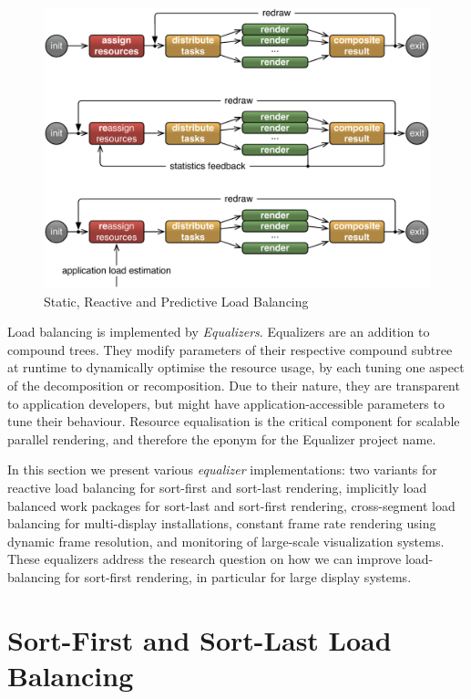 \begin{figure}[h!t]
  \includegraphics[width=\textwidth]{images/loadBalancing}
  \caption{\label{floadbalancing}Static, Reactive and Predictive Load Balancing}
\end{figure}

Load balancing is implemented by {\em Equalizers}. Equalizers are an addition
to compound trees. They modify parameters of their respective compound subtree
at runtime to dynamically optimise the resource usage, by each tuning one
aspect of the decomposition or recomposition. Due to their nature, they are
transparent to application developers, but might have application-accessible
parameters to tune their behaviour. Resource equalisation is the critical
component for scalable parallel rendering, and therefore the eponym for the
\textsf{Equalizer} project name.

In this section we present various {\em equalizer} implementations: two
variants for reactive load balancing for sort-first and sort-last rendering,
implicitly load balanced work packages for sort-last and sort-first rendering,
cross-segment load balancing for multi-display installations, constant frame
rate rendering using dynamic frame resolution, and monitoring of large-scale
visualization systems. These equalizers address the research question on how we can improve load-balancing for sort-first rendering, in particular for large display systems.

\section{Sort-First and Sort-Last Load Balancing}\label{sLoadEqualizer}

